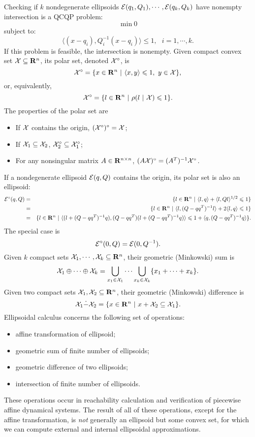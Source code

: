 Checking if $k$ nondegenerate ellipsoids $\EE(q_1,Q_1),\cdots,\EE(q_k,Q_k)$
have nonempty intersection is a QCQP problem:
\[ \min 0 \]
subject to:
\[ \langle (x-q_i),Q_i^{-1}(x-q_i)\rangle \leq 1, ~~~ i=1,\cdots,k. \]
If this problem is feasible,  the intersection is nonempty.
\bd
Given compact convex set $\XX\subseteq{\bf R}^n$, its polar set, denoted
$\XX^\circ$, is
\[ \XX^\circ = \{x\in{\bf R}^n ~|~ \langle x,y\rangle\leq 1, ~ y\in\XX\}, \]
or, equivalently,
\[ \XX^\circ = \{l\in{\bf R}^n ~|~ \rho(l ~|~ \XX)\leq 1\}. \]
\ed
The properties of the polar set are
\begin{itemize}
\item If  $\XX$ contains the origin,  $(\XX^\circ)^\circ = \XX$;
\item If $\XX_1\subseteq\XX_2$,  $\XX_2^\circ\subseteq\XX_1^\circ$;
\item For any nonsingular matrix $A\in{\bf R}^{n\times n}$,
$(A\XX)^\circ = (A^T)^{-1}\XX^\circ$.
\end{itemize}
If a nondegenerate ellipsoid $\EE(q,Q)$ contains the origin,
 its polar set is also an ellipsoid:
\begin{eqnarray*}
\EE^\circ(q,Q) & = & \{l\in{\bf R}^n ~|~ \langle l,q\rangle +
\langle l,Ql\rangle^{1/2}\leq1 \}\\
& = & \{l\in{\bf R}^n ~|~ \langle l,(Q-qq^T)^{-1}l\rangle +
2\langle l,q\rangle\leq1 \}\\ 
& = & \{l\in{\bf R}^n ~|~ \langle(l+(Q-qq^T)^{-1}q),
(Q-qq^T)(l+(Q-qq^T)^{-1}q)\rangle\leq1+\langle q,(Q-qq^T)^{-1}q\rangle \}.
\end{eqnarray*}
The special case is
\[ \EE^\circ(0,Q) = \EE(0,Q^{-1}). \]
\bd
Given $k$ compact sets $\XX_1, \cdots, \XX_k\subseteq{\bf R}^n$,
their geometric (Minkowski) sum is
\begin{equation}
\XX_1\oplus\cdots\oplus\XX_k=\bigcup_{x_1\in\XX_1}\cdots\bigcup_{x_k\in\XX_k}
\{x_1 + \cdots + x_k\} .  \label{minksum}
\end{equation}
\ed
\bd
Given two compact sets $\XX_1, \XX_2 \subseteq{\bf R}^n$, their geometric
(Minkowski) difference is
\begin{equation}
\XX_1\dot{-}\XX_2 = \{x\in{\bf R}^n ~|~ x + \XX_2 \subseteq \XX_1 \}.
\label{minkdiff}
\end{equation}
\ed
Ellipsoidal calculus concerns the following set of operations:
\begin{itemize}
\item affine transformation of ellipsoid;
\item geometric sum of finite number of ellipsoids;
\item geometric difference of two ellipsoids;
\item intersection of finite number of ellipsoids.
\end{itemize}
These operations occur in reachability calculation and verification
of piecewise affine dynamical systems. The result of all of these operations,
except for the affine transformation, is \emph{not} generally an ellipsoid
but some convex set, for which we can compute external and internal ellipsoidal
approximations.

